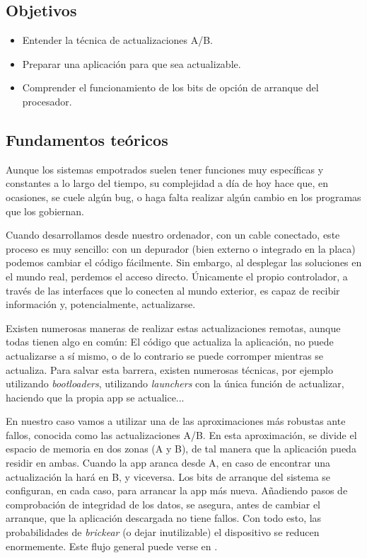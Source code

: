 \documentclass[../main.tex]{subfiles}
\begin{document}

    \subsection{Objetivos}
        \begin{itemize}
            \item Entender la técnica de actualizaciones A/B.
            \item Preparar una aplicación para que sea actualizable.
            \item Comprender el funcionamiento de los bits de opción de arranque del procesador.
        \end{itemize}

    \subsection{Fundamentos teóricos}

        Aunque los sistemas empotrados suelen tener funciones muy específicas y constantes a lo largo del tiempo, su complejidad a día de hoy hace que, en ocasiones, se cuele algún bug, o haga falta realizar algún cambio en los programas que los gobiernan. 

        Cuando desarrollamos desde nuestro ordenador, con un cable conectado, este proceso es muy sencillo: con un depurador (bien externo o integrado en la placa) podemos cambiar el código fácilmente. Sin embargo, al desplegar las soluciones en el mundo real, perdemos el acceso directo. Únicamente el propio controlador, a través de las interfaces que lo conecten al mundo exterior, es capaz de recibir información y, potencialmente, actualizarse.

        Existen numerosas maneras de realizar estas actualizaciones remotas, aunque todas tienen algo en común: El código que actualiza la aplicación, no puede actualizarse a sí mismo, o de lo contrario se puede corromper mientras se actualiza. Para salvar esta barrera, existen numerosas técnicas, por ejemplo utilizando \emph{bootloaders}, utilizando \emph{launchers} con la única función de actualizar, haciendo que la propia app se actualice...

        En nuestro caso vamos a utilizar una de las aproximaciones más robustas ante fallos, conocida como las actualizaciones A/B. En esta aproximación, se divide el espacio de memoria en dos zonas (A y B), de tal manera que la aplicación pueda residir en ambas. Cuando la app aranca desde A, en caso de encontrar una actualización la hará en B, y viceversa. Los bits de arranque del sistema se configuran, en cada caso, para arrancar la app más nueva. Añadiendo pasos de comprobación de integridad de los datos, se asegura, antes de cambiar el arranque, que la aplicación descargada no tiene fallos. Con todo esto, las probabilidades de \emph{brickear} (o dejar inutilizable) el dispositivo se reducen enormemente. Este flujo general puede verse en .
\end{document}
